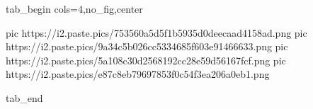  
 
 
 
 


\ifcmt
  tab_begin cols=4,no_fig,center

     pic https://i2.paste.pics/753560a5d5f1b5935d0deecaad4158ad.png
		 pic https://i2.paste.pics/9a34c5b026cc5334685f603e91466633.png
		 pic https://i2.paste.pics/5a108c30d2568192cc28e59d56167fcf.png
		 pic https://i2.paste.pics/e87c8eb79697853f0c54f3ea206a0eb1.png

  tab_end
\fi
